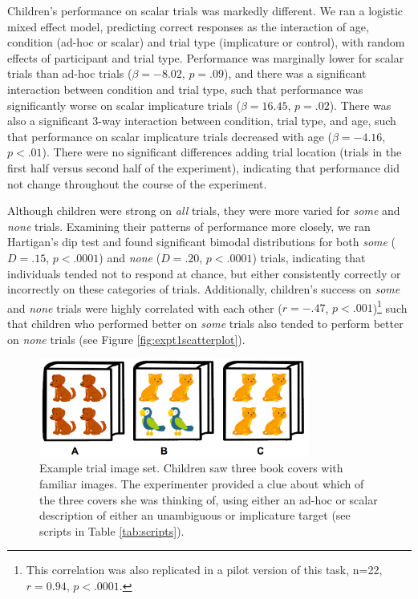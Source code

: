 \documentclass[10pt,letterpaper]{article}
\begin{document}
Children's performance on scalar trials was markedly different. We ran a logistic mixed effect model, predicting correct responses as the interaction of age, condition (ad-hoc or scalar) and trial type (implicature or control), with random effects of participant and trial type. Performance was marginally lower for scalar trials than ad-hoc trials ($\beta = -8.02$, $p =.09$), and there was a significant interaction between condition and trial type, such that performance was significantly worse on scalar implicature trials ($\beta = 16.45$, $p = .02$).  There was also a significant 3-way interaction between condition, trial type, and age, such that performance on scalar implicature trials decreased with age ($\beta = -4.16$, $p < .01$). There were no significant differences adding trial location (trials in the first half versus second half of the experiment), indicating that performance did not change throughout the course of the experiment.

Although children were strong on \emph{all} trials, they were more varied for \emph{some} and \emph{none} trials.  Examining their patterns of performance more closely, we ran Hartigan's dip test and found significant bimodal distributions for both \emph{some} ($D=.15$, $p<.0001$) and \emph{none} ($D=.20$, $p<.0001$) trials, indicating that individuals tended not to respond at chance, but either consistently correctly or incorrectly on these categories of trials. Additionally, children's success on \emph{some} and \emph{none} trials were highly correlated with each other ($r=-.47$, $p<.001$)\footnote{This correlation was also replicated in a pilot version of this task, n=22, $r=0.94$, $p<.0001$.} such that children who performed better on \emph{some} trials also tended to perform better on \emph{none} trials (see Figure \ref{fig:expt1scatterplot}).  

 \begin{figure}[h] 
  \begin{center} 
    \includegraphics[width=3.5in]{figures/implicatures_demo_letters.png} 
    \caption{\label{fig:demo} Example trial image set. Children saw three book covers with familiar images. The experimenter provided a clue about which of the three covers she was thinking of, using either an ad-hoc or scalar description of either an unambiguous or implicature target (see scripts in Table \ref{tab:scripts}).}
    \end{center} 
\end{figure}
\end{document}
